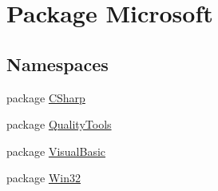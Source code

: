 \hypertarget{namespace_microsoft}{\section{Package Microsoft}
\label{namespace_microsoft}
}
\subsection*{Namespaces}
\begin{DoxyCompactItemize}
\item 
package \hyperlink{namespace_microsoft_1_1_c_sharp}{C\-Sharp}
\item 
package \hyperlink{namespace_microsoft_1_1_quality_tools}{Quality\-Tools}
\item 
package \hyperlink{namespace_microsoft_1_1_visual_basic}{Visual\-Basic}
\item 
package \hyperlink{namespace_microsoft_1_1_win32}{Win32}
\end{DoxyCompactItemize}
